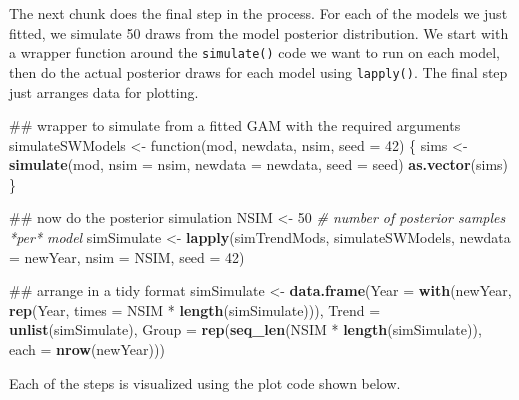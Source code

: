 \documentclass[12pt,]{article}
\newenvironment{Shaded}{\begin{snugshade}}{\end{snugshade}}
\newcommand{\KeywordTok}[1]{\textcolor[rgb]{0.13,0.29,0.53}{\textbf{{#1}}}}
\newcommand{\DataTypeTok}[1]{\textcolor[rgb]{0.13,0.29,0.53}{{#1}}}
\newcommand{\DecValTok}[1]{\textcolor[rgb]{0.00,0.00,0.81}{{#1}}}
\newcommand{\StringTok}[1]{\textcolor[rgb]{0.31,0.60,0.02}{{#1}}}
\newcommand{\CommentTok}[1]{\textcolor[rgb]{0.56,0.35,0.01}{\textit{{#1}}}}
\newcommand{\NormalTok}[1]{{#1}}
\begin{document}
The next chunk does the final step in the process. For each of the
models we just fitted, we simulate 50 draws from the model posterior
distribution. We start with a wrapper function around the
\texttt{simulate()} code we want to run on each model, then do the
actual posterior draws for each model using \texttt{lapply()}. The final
step just arranges data for plotting.

\begin{Shaded}
\begin{Highlighting}[]
\NormalTok{## wrapper to simulate from a fitted GAM with the required arguments}
\NormalTok{simulateSWModels <-}\StringTok{ }\NormalTok{function(mod, newdata, nsim, }\DataTypeTok{seed =} \DecValTok{42}\NormalTok{) \{}
    \NormalTok{sims <-}\StringTok{ }\KeywordTok{simulate}\NormalTok{(mod, }\DataTypeTok{nsim =} \NormalTok{nsim, }\DataTypeTok{newdata =} \NormalTok{newdata, }\DataTypeTok{seed =} \NormalTok{seed)}
    \KeywordTok{as.vector}\NormalTok{(sims)}
\NormalTok{\}}

\NormalTok{## now do the posterior simulation}
\NormalTok{NSIM <-}\StringTok{ }\DecValTok{50}     \CommentTok{# number of posterior samples *per* model}
\NormalTok{simSimulate <-}\StringTok{ }\KeywordTok{lapply}\NormalTok{(simTrendMods, simulateSWModels, }\DataTypeTok{newdata =} \NormalTok{newYear,}
                      \DataTypeTok{nsim =} \NormalTok{NSIM, }\DataTypeTok{seed =} \DecValTok{42}\NormalTok{)}

\NormalTok{## arrange in a tidy format}
\NormalTok{simSimulate <-}
\StringTok{  }\KeywordTok{data.frame}\NormalTok{(}\DataTypeTok{Year  =} \KeywordTok{with}\NormalTok{(newYear,}
                          \KeywordTok{rep}\NormalTok{(Year, }\DataTypeTok{times =} \NormalTok{NSIM *}\StringTok{ }\KeywordTok{length}\NormalTok{(simSimulate))),}
             \DataTypeTok{Trend =} \KeywordTok{unlist}\NormalTok{(simSimulate),}
             \DataTypeTok{Group =} \KeywordTok{rep}\NormalTok{(}\KeywordTok{seq_len}\NormalTok{(NSIM *}\StringTok{ }\KeywordTok{length}\NormalTok{(simSimulate)),}
                         \DataTypeTok{each =} \KeywordTok{nrow}\NormalTok{(newYear)))}
\end{Highlighting}
\end{Shaded}

Each of the steps is visualized using the plot code shown below.
\end{document}
